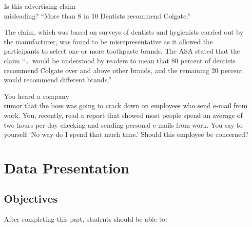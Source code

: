 \documentclass[11pt]{book}\usepackage[]{graphicx}\usepackage[]{color}
\begin{document}
\begin{exercises}
\begin{exercise}
Is this advertising claim \\ misleading? 
``More than 8 in 10 Dentists recommend Colgate.''

\end{exercise}
\begin{solution}    %

The claim, which was based on surveys of dentists and hygienists carried out by the manufacturer, was found to be misrepresentative as it allowed the participants to select one or more toothpaste brands. The ASA stated that the claim ``… would be understood by readers to mean that 80 percent of dentists recommend Colgate over and above other brands, and the remaining 20 percent would recommend different brands.''

\end{solution}

\begin{exercise}   %

You heard a company \\ rumor that the boss was going to crack down on employees who send e-mail from work.  You, recently, read a report that showed most people spend an average of two hours per day checking and sending personal e-mails from work.  You say to yourself `No way do I spend that much time.'  Should this employee be concerned?    

\end{exercise}
\begin{solution}    %

\end{solution}






\end{exercises}

\onecolumn




\chapter{Data Presentation}
\label{chap:ch2}

\section{Objectives}

After completing this part, students should be able to:
\end{document}
